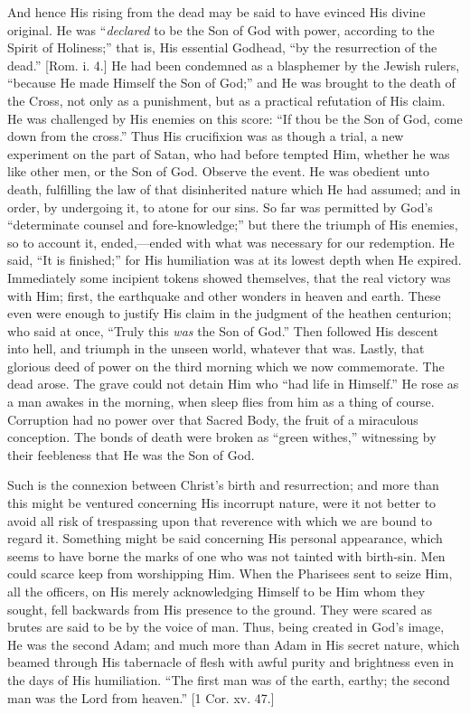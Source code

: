 And hence His rising from the dead may be said to have evinced His
divine original. He was ``\emph{declared} to be the Son of God with power,
according to the Spirit of Holiness;'' that is, His essential
Godhead, ``by the resurrection of the dead.'' [Rom. i. 4.] He
had been condemned as a blasphemer by the Jewish rulers, ``because
He made Himself the Son of God;'' and He was brought to the death of
the Cross, not only as a punishment, but as a practical refutation of
His claim. He was challenged by His enemies on this score: ``If thou
be the Son of God, come down from the cross.'' Thus His crucifixion
was as though a trial, a new experiment on the part of Satan, who had
before tempted Him, whether he was like other men, or the Son of God.
Observe the event. He was obedient unto death, fulfilling the law of
that disinherited nature which He had assumed; and in order, by
undergoing it, to atone for our sins. So far was permitted by God's
``determinate counsel and fore-knowledge;'' but there the
triumph of His enemies, so to account it, ended,—ended with what was
necessary for our redemption. He said, ``It is finished;'' for
His humiliation was at its lowest depth when He expired. Immediately
some incipient tokens showed themselves, that the real victory was with
Him; first, the earthquake and other wonders in heaven and earth. These
even were enough to justify His claim in the judgment of the heathen
centurion; who said at once, ``Truly this \emph{was} the Son of God.''
Then followed His descent into hell, and triumph in the unseen world,
whatever that was. Lastly, that glorious deed of power on the third
morning which we now commemorate. The dead arose. The grave could not
detain Him who ``had life in Himself.'' He rose as a man awakes
in the morning, when sleep flies from him as a thing of course.
Corruption had no power over that Sacred Body, the fruit of a miraculous
conception. The bonds of death were broken as ``green withes,''
witnessing by their feebleness that He was the Son of God.

Such is the connexion between Christ's birth and resurrection; and
more than this might be ventured concerning His incorrupt nature, were
it not better to avoid all risk of trespassing upon that reverence with
which we are bound to regard it. Something might be said concerning His
personal appearance, which seems to have borne the marks of one who was
not tainted with birth-sin. Men could scarce keep from worshipping Him.
When the Pharisees sent to seize Him, all the officers, on His merely
acknowledging Himself to be Him whom they sought, fell backwards from His
presence to the ground. They were scared as brutes are said to be by the
voice of man. Thus, being created in God's image, He was the second
Adam; and much more than Adam in His secret nature, which beamed through
His tabernacle of flesh with awful purity and brightness even in the
days of His humiliation. ``The first man was of the earth, earthy;
the second man was the Lord from heaven.'' [1 Cor. xv. 47.]

